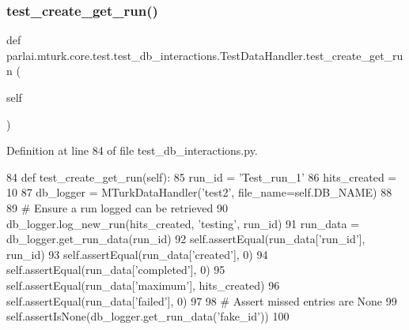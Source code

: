 \subsubsection{\texorpdfstring{test\+\_\+create\+\_\+get\+\_\+run()}{test\_create\_get\_run()}}
{\footnotesize\ttfamily def parlai.\+mturk.\+core.\+test.\+test\+\_\+db\+\_\+interactions.\+Test\+Data\+Handler.\+test\+\_\+create\+\_\+get\+\_\+run (\begin{DoxyParamCaption}\item[{}]{self }\end{DoxyParamCaption})}



Definition at line 84 of file test\+\_\+db\+\_\+interactions.\+py.


\begin{DoxyCode}
84     \textcolor{keyword}{def }test\_create\_get\_run(self):
85         run\_id = \textcolor{stringliteral}{'Test\_run\_1'}
86         hits\_created = 10
87         db\_logger = MTurkDataHandler(\textcolor{stringliteral}{'test2'}, file\_name=self.DB\_NAME)
88 
89         \textcolor{comment}{# Ensure a run logged can be retrieved}
90         db\_logger.log\_new\_run(hits\_created, \textcolor{stringliteral}{'testing'}, run\_id)
91         run\_data = db\_logger.get\_run\_data(run\_id)
92         self.assertEqual(run\_data[\textcolor{stringliteral}{'run\_id'}], run\_id)
93         self.assertEqual(run\_data[\textcolor{stringliteral}{'created'}], 0)
94         self.assertEqual(run\_data[\textcolor{stringliteral}{'completed'}], 0)
95         self.assertEqual(run\_data[\textcolor{stringliteral}{'maximum'}], hits\_created)
96         self.assertEqual(run\_data[\textcolor{stringliteral}{'failed'}], 0)
97 
98         \textcolor{comment}{# Assert missed entries are None}
99         self.assertIsNone(db\_logger.get\_run\_data(\textcolor{stringliteral}{'fake\_id'}))
100 
\end{DoxyCode}
\mbox{\label{classparlai_1_1mturk_1_1core_1_1test_1_1test__db__interactions_1_1TestDataHandler_a908018363b47f8e72677fbd0dc29a600}} 
